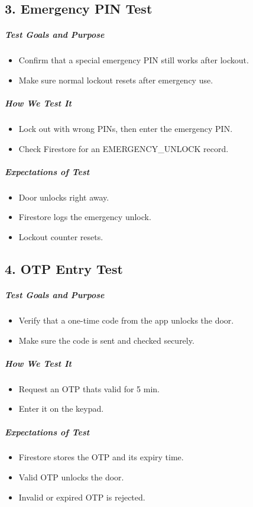 \subsection*{3. Emergency PIN Test}
\subparagraph{Test Goals and Purpose}
\begin{itemize}
    \item Confirm that a special emergency PIN still works after lockout.
    \item Make sure normal lockout resets after emergency use.
\end{itemize}
\subparagraph{How We Test It}
\begin{itemize}
    \item Lock out with wrong PINs, then enter the emergency PIN.
    \item Check Firestore for an EMERGENCY\_UNLOCK record.
\end{itemize}
\subparagraph{Expectations of Test}
\begin{itemize}
    \item Door unlocks right away.
    \item Firestore logs the emergency unlock.
    \item Lockout counter resets.
\end{itemize}

\subsection*{4. OTP Entry Test}
\subparagraph{Test Goals and Purpose}
\begin{itemize}
    \item Verify that a one-time code from the app unlocks the door.
    \item Make sure the code is sent and checked securely.
\end{itemize}
\subparagraph{How We Test It}
\begin{itemize}
    \item Request an OTP thats valid for 5 min.
    \item Enter it on the keypad.
\end{itemize}
\subparagraph{Expectations of Test}
\begin{itemize}
    \item Firestore stores the OTP and its expiry time.
    \item Valid OTP unlocks the door.
    \item Invalid or expired OTP is rejected.
\end{itemize}

